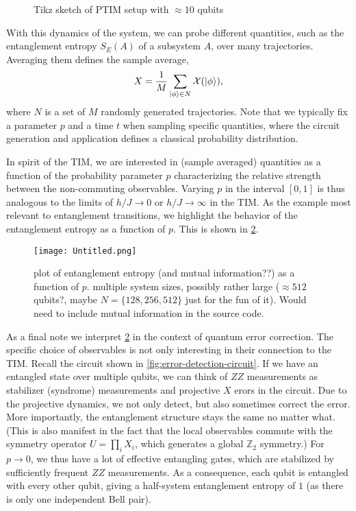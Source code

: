 \begin{figure}[t]
  \centering
  
  \caption{Tikz sketch of PTIM setup with $\approx 10$ qubits}
  \label{fig:ptim-circuit}
\end{figure}

With this dynamics of the system, we can probe different quantities, such as
the entanglement entropy $S_E(A)$ of a subsystem $A$, over many trajectories.
Averaging them defines the sample average,
\begin{align}
  X = \frac{1}{M} \sum_{\ket{\phi} \in N} \mathcal{X}(\ket{\phi})
,\end{align}
where $N$ is a set of $M$ randomly generated trajectories. Note that we
typically fix a parameter $p$ and a time $t$ when sampling specific quantities,
where the circuit generation and application defines a classical probability
distribution. 

In spirit of the TIM, we are interested in (sample averaged) quantities as a
function of the probability parameter $p$ characterizing the relative strength
between the non-commuting observables. Varying $p$ in the interval $[0,1]$ is
thus analogous to the limits of $h /J \to 0$ or  $h /J \to \infty$ in the TIM.
As the example most relevant to entanglement transitions, we highlight the
behavior of the entanglement entropy as a function of $p$. This is shown in
\cref{fig:phase-transition}.

\begin{figure}[t]
  \centering
  \texttt{[image: Untitled.png]}
  \caption{plot of entanglement entropy (and mutual information??) as a
  function of $p$. multiple system sizes, possibly rather large ($\approx 512$
qubits?, maybe $N=\{128,256,512\}$ just for the fun of it). Would need to
include mutual information in the source code.}
  \label{fig:phase-transition}
\end{figure}

As a final note we interpret \cref{fig:phase-transition} in the context of
quantum error correction. The specific choice of observables is not only
interesting in their connection to the TIM.
Recall the circuit shown in
\cref{fig:error-detection-circuit}. If we have an entangled state over multiple
qubits, we can think of $ZZ$ measurements as stabilizer (syndrome) measurements
and projective $X$ erors in the circuit. Due to the projective dynamics,
we not only detect, but also sometimes correct the error. More importantly, the
entanglement structure stays the same no matter what. (This is also manifest in
the fact that the local observables commute with the symmetry operator
$U=\prod_i X_i$, which generates a global $\mathbb{Z}_2$ symmetry.)
For $p\to 0$, we thus
have a lot of effective entangling gates, which are stabilized by sufficiently
frequent $ZZ$ measurements. As a consequence, each qubit is entangled with
every other qubit, giving a half-system entanglement entropy of $1$ (as there
is only one independent Bell pair).


